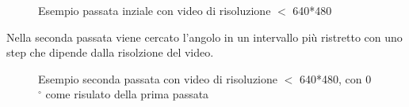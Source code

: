 \documentclass[12pt]{article}
\begin{document}
\begin{figure}[h!]
	\begin{center}
	  \caption{Esempio passata inziale con video di risoluzione $<$ 640*480}
	\end{center}
\end{figure}

\clearpage

Nella seconda passata viene cercato l'angolo in un intervallo più ristretto con uno step che dipende dalla risolzione del video.


\begin{figure}[h!]
	\begin{center}
	  \caption{Esempio seconda passata con video di risoluzione $<$ 640*480, con 0$^{\circ}$ come risulato della prima passata}
	\end{center}
\end{figure}
\end{document}
